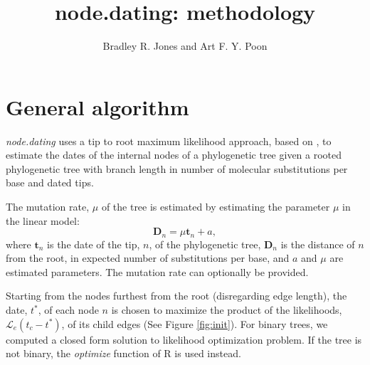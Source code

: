 \documentclass[12pt]{article}
\title{node.dating: methodology}
\author{Bradley R. Jones and Art F. Y. Poon}
\newcommand{\code}[1]{\emph{#1}}
\begin{document}
	\maketitle
	
	\section{General algorithm}	
		\code{node.dating} uses a tip to root maximum likelihood approach, based on \cite{Felsenstein81, TipDates}, to estimate the dates of the internal nodes of a phylogenetic tree given a rooted phylogenetic tree with branch length in number of molecular substitutions per base and dated tips.
		
		The mutation rate, $\mu$ of the tree is estimated by estimating the parameter $\mu$ in the linear model:
		\[\mathbf{D}_n = \mu\mathbf{t}_n + a,\]
		where $\mathbf{t}_n$ is the date of the tip, $n$, of the phylogenetic tree, $\mathbf{D}_n$ is the distance of $n$ from the root, in expected number of substitutions per base, and $a$ and $\mu$ are estimated parameters.
		The mutation rate can optionally be provided.
		
		Starting from the nodes furthest from the root (disregarding edge length), the date, $t^*$, of each node $n$ is chosen to maximize the product of the likelihoods, $\mathcal{L}_e(t_c - t^*)$, of its child edges (See Figure  \ref{fig:init}). For binary trees, we computed a closed form solution to likelihood optimization problem. If the tree is not binary, the \code{optimize} function of R is used instead.
		
\end{document}
